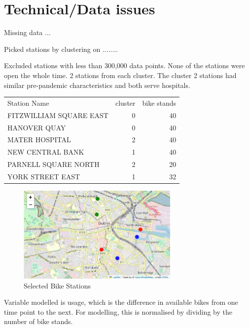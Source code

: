 \documentclass[12pt,letterpaper]{article}
\begin{document}
\section{Technical/Data issues}
Missing data ...




Picked stations by clustering on ........

Excluded stations with less than 300,000 data points.   None of the stations were open the whole time.
2 stations from each cluster.  The cluster 2 stations had similar pre-pandemic characteristics and both serve hospitals.%

\begin{table}[h]
	\centering
	\begin{tabular}{|l|r|r|}
		Station Name & cluster & bike stands\\
		FITZWILLIAM SQUARE EAST & 0 & 40\\
		HANOVER QUAY & 0 & 40\\
		MATER HOSPITAL & 2 & 40\\
		NEW CENTRAL BANK & 1 & 40 \\
		PARNELL SQUARE NORTH & 2 & 20\\
		YORK STREET EAST & 1 & 32 \\
		
	\end{tabular} 
\end{table}


\begin{figure}[!htbp]
	\includegraphics[width=0.7\textwidth]{../graphs/bikeStationMap.png}
	\caption{Selected Bike Stations}
	\label{fig:stations}
\end{figure}

Variable modelled is usage, which is the difference in available bikes from one time point to the next.  For modelling, this is normalised by dividing by the number of bike stands.
\end{document}
